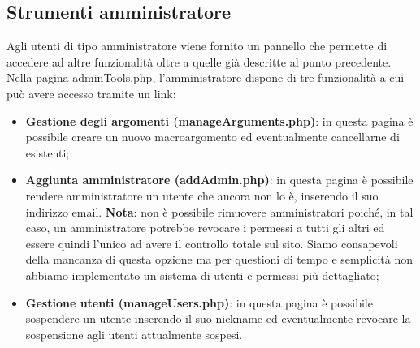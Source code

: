 \documentclass[12pt]{article}
\begin{document}
	\subsection{Strumenti amministratore}
	Agli utenti di tipo amministratore viene fornito un pannello che permette di accedere ad altre funzionalità oltre a quelle già descritte al punto precedente. Nella pagina adminTools.php, l'amministratore dispone di tre funzionalità a cui può avere accesso tramite un link:
	\begin{itemize}	
		\item \textbf{Gestione degli argomenti (manageArguments.php)}: in questa pagina è possibile creare un nuovo macroargomento ed eventualmente cancellarne di esistenti;
		\item \textbf{Aggiunta amministratore (addAdmin.php)}: in questa pagina è possibile rendere amministratore un utente che ancora non lo è, inserendo il suo indirizzo email. \textbf{Nota}: non è possibile rimuovere amministratori poiché, in tal caso, un amministratore potrebbe revocare i permessi a tutti gli altri ed essere quindi l'unico ad avere il controllo totale sul sito. Siamo consapevoli della mancanza di questa opzione ma per questioni di tempo e semplicità non abbiamo implementato un sistema di utenti e permessi più dettagliato;
		\item \textbf{Gestione utenti (manageUsers.php)}: in questa pagina è possibile sospendere un utente inserendo il suo nickname ed eventualmente revocare la sospensione agli utenti attualmente sospesi.
	\end{itemize}
\end{document}
